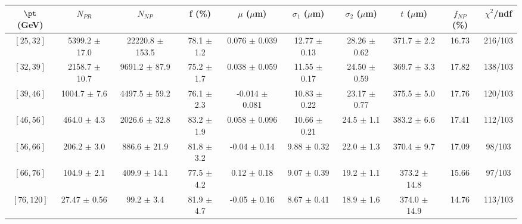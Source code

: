 \begin{tabular}{c||c|c|c|c|c|c|c||c|c}
$\pt$ (GeV) & $N_{PR}$ & $N_{NP}$ & f (\%) & $\mu$ ($\mu$m) & $\sigma_1$ ($\mu$m) & $\sigma_2$ ($\mu$m)  & $t$ ($\mu$m) & $f_{NP}$ (\%) & $\chi^2$/ndf \\
\hline
$[25, 32]$ & 5399.2 $\pm$ 17.0 & 22220.8 $\pm$ 153.5 & 78.1 $\pm$ 1.2 & 0.076 $\pm$ 0.039 & 12.77 $\pm$ 0.13 & 28.26 $\pm$ 0.62 & 371.7 $\pm$ 2.2 & 16.73 & 216/103\\
$[32, 39]$ & 2158.7 $\pm$ 10.7 & 9691.2 $\pm$ 87.9 & 75.2 $\pm$ 1.7 & 0.038 $\pm$ 0.059 & 11.55 $\pm$ 0.17 & 24.50 $\pm$ 0.59 & 369.7 $\pm$ 3.3 & 17.82 & 138/103\\
$[39, 46]$ & 1004.7 $\pm$ 7.6 & 4497.5 $\pm$ 59.2 & 76.1 $\pm$ 2.3 & -0.014 $\pm$ 0.081 & 10.83 $\pm$ 0.22 & 23.17 $\pm$ 0.77 & 375.5 $\pm$ 5.0 & 17.76 & 120/103\\
$[46, 56]$ & 464.0 $\pm$ 4.3 & 2026.6 $\pm$ 32.8 & 83.2 $\pm$ 1.9 & 0.058 $\pm$ 0.096 & 10.66 $\pm$ 0.21 & 24.5 $\pm$ 1.1 & 383.2 $\pm$ 6.6 & 17.41 & 112/103\\
$[56, 66]$ & 206.2 $\pm$ 3.0 & 886.6 $\pm$ 21.9 & 81.8 $\pm$ 3.2 & -0.04 $\pm$ 0.14 & 9.88 $\pm$ 0.32 & 22.0 $\pm$ 1.3 & 370.4 $\pm$ 9.7 & 17.09 & 98/103\\
$[66, 76]$ & 104.9 $\pm$ 2.1 & 409.9 $\pm$ 14.1 & 77.5 $\pm$ 4.2 & 0.12 $\pm$ 0.18 & 9.07 $\pm$ 0.39 & 19.2 $\pm$ 1.1 & 373.2 $\pm$ 14.8 & 15.66 & 97/103\\
$[76, 120]$ & 27.47 $\pm$ 0.56 & 99.2 $\pm$ 3.4 & 81.9 $\pm$ 4.7 & -0.05 $\pm$ 0.16 & 8.67 $\pm$ 0.41 & 18.9 $\pm$ 1.6 & 374.0 $\pm$ 14.9 & 14.76 & 113/103\\
\end{tabular}
